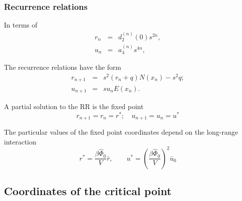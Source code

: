 \documentclass[8pt]{beamer}
\begin{document}
	\begin{frame}
		\frametitle{Recurrence relations}
		
		In terms of
		\begin{eqnarray*}
			r_n & = & d_2^{(n)}(0)s^{2n},
			\\
			u_n & = & a_4^{(n)}s^{4n},
		\end{eqnarray*}
		
		The recurrence relations have the form
		\begin{eqnarray*}
			r_{n+1} & = & s^2(r_n + q) N(x_n) - s^2 q;
			\nonumber\\
			u_{n+1} & = & s u_n E(x_n).
		\end{eqnarray*}
		
		A partial solution to the RR is the fixed point
		\begin{equation*}
			r_{n+1} = r_n = r^*; \quad u_{n+1} = u_n = u^*
		\end{equation*}
		
		The particular values of the fixed point coordinates depend on the long-range interaction
		\begin{equation*}
			r^* = \frac{\beta\hat{\Phi}_0}{V} \bar{r}, 
			\qquad 
			u^* = \left(\frac{\beta\hat{\Phi}_0}{V}\right)^2 \bar{u}_0
		\end{equation*}
	\end{frame}
	
	\subsection{Coordinates of the critical point}
	
\end{document}
